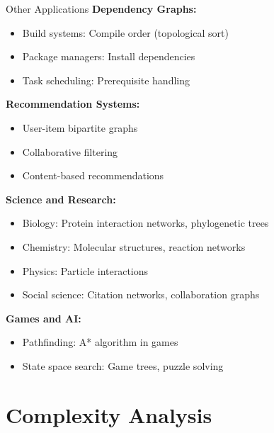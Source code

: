 \documentclass[aspectratio=169]{beamer}
\begin{document}
\begin{frame}{Other Applications}
  \textbf{Dependency Graphs:}
  \begin{itemize}
    \item Build systems: Compile order (topological sort)
    \item Package managers: Install dependencies
    \item Task scheduling: Prerequisite handling
  \end{itemize}

  \vspace{0.3cm}
  \textbf{Recommendation Systems:}
  \begin{itemize}
    \item User-item bipartite graphs
    \item Collaborative filtering
    \item Content-based recommendations
  \end{itemize}

  \vspace{0.3cm}
  \textbf{Science and Research:}
  \begin{itemize}
    \item Biology: Protein interaction networks, phylogenetic trees
    \item Chemistry: Molecular structures, reaction networks
    \item Physics: Particle interactions
    \item Social science: Citation networks, collaboration graphs
  \end{itemize}

  \vspace{0.3cm}
  \textbf{Games and AI:}
  \begin{itemize}
    \item Pathfinding: A* algorithm in games
    \item State space search: Game trees, puzzle solving
  \end{itemize}
\end{frame}

\section{Complexity Analysis}
\end{document}
